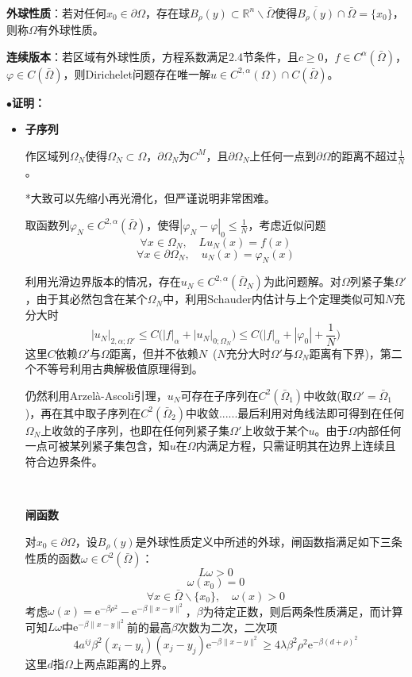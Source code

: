 \documentclass[a4paper,UTF8,fontset=windows,AutoFakeBold]{ctexart}
\newcommand*{\er}{\mathrm{e}}
\newcommand{\proo}[1]{{\kaishu $\bullet$\textbf{证明：}
\begin{itemize}
    \item[] #1
\end{itemize}
}}
\begin{document}
\

\textbf{外球性质}：若对任何$x_0\in\partial\Omega$，存在球$B_\rho(y)\subset\mathbb{R}^n\backslash\bar\Omega$使得$\overline{B_\rho(y)}\cap\bar\Omega=\{x_0\}$，则称$\Omega$有外球性质。

\textbf{连续版本}：若区域有外球性质，方程系数满足2.4节条件，且$c\ge0$，$f\in C^\alpha(\bar\Omega)$，$\varphi\in C(\bar\Omega)$，则Dirichelet问题存在唯一解$u\in C^{2,\alpha}(\Omega)\cap C(\bar\Omega)$。

\proo{
    \textbf{子序列}

    作区域列$\Omega_N$使得$\Omega_N\subset\Omega$，$\partial\Omega_N$为$C^M$，且$\partial\Omega_N$上任何一点到$\partial\Omega$的距离不超过$\frac{1}{N}$。

    *大致可以先缩小再光滑化，但严谨说明非常困难。

    取函数列$\varphi_N\in C^{2,\alpha}(\bar\Omega)$，使得$|\varphi_N-\varphi|_0\le\frac{1}{N}$，考虑近似问题
    $$\forall x\in\Omega_N,\quad Lu_N(x)=f(x)$$
    $$\forall x\in\partial\Omega_N,\quad u_N(x)=\varphi_N(x)$$

    利用光滑边界版本的情况，存在$u_N\in C^{2,\alpha}(\bar\Omega_N)$为此问题解。对$\Omega$列紧子集$\Omega'$，由于其必然包含在某个$\Omega_N$中，利用Schauder内估计与上个定理类似可知$N$充分大时
    $$|u_N|_{2,\alpha;\Omega'}\le C\big(|f|_\alpha+|u_N|_{0;\Omega_N}\big)\le C\bigg(|f|_\alpha+|\varphi_0|+\frac{1}{N}\bigg)$$
    这里$C$依赖$\Omega'$与$\Omega$距离，但并不依赖$N$\ ($N$充分大时$\Omega'$与$\Omega_N$距离有下界)，第二个不等号利用古典解极值原理得到。

    仍然利用Arzel\`a-Ascoli引理，$u_N$可存在子序列在$C^2(\bar\Omega_1)$中收敛(取$\Omega'=\bar\Omega_1$)，再在其中取子序列在$C^2(\bar\Omega_2)$中收敛......最后利用对角线法即可得到在任何$\Omega_N$上收敛的子序列，也即在任何列紧子集$\Omega'$上收敛于某个$u$。由于$\Omega$内部任何一点可被某列紧子集包含，知$u$在$\Omega$内满足方程，只需证明其在边界上连续且符合边界条件。

    \

    \textbf{闸函数}

    对$x_0\in\partial\Omega$，设$B_\rho(y)$是外球性质定义中所述的外球，闸函数指满足如下三条性质的函数$\omega\in C^2(\bar\Omega)$：
    $$L\omega>0$$
    $$\omega(x_0)=0$$
    $$\forall x\in\bar\Omega\backslash\{x_0\},\quad\omega(x)>0$$
    考虑$\omega(x)=\er^{-\beta\rho^2}-\er^{-\beta\|x-y\|^2}$，$\beta$为待定正数，则后两条性质满足，而计算可知$L\omega$中$\er^{-\beta\|x-y\|^2}$前的最高$\beta$次数为二次，二次项
    $$4a^{ij}\beta^2(x_i-y_i)(x_j-y_j)\er^{-\beta\|x-y\|^2}\ge4\lambda\beta^2\rho^2\er^{-\beta(d+\rho)^2}$$
    这里$d$指$\Omega$上两点距离的上界。

}
\end{document}
